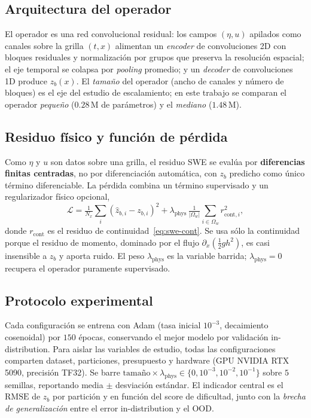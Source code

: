 \documentclass[conference]{IEEEtran}
\newcommand{\zb}{z_b}
\newcommand{\RMSE}{\mathrm{RMSE}}
\begin{document}
\subsection{Arquitectura del operador}
El operador es una red convolucional residual: los campos $(\eta,u)$ apilados
como canales sobre la grilla $(t,x)$ alimentan un \emph{encoder} de
convoluciones 2D con bloques residuales y normalización por grupos que preserva
la resolución espacial; el eje temporal se colapsa por \emph{pooling} promedio; y
un \emph{decoder} de convoluciones 1D produce $\zb(x)$. El \emph{tamaño} del
operador (ancho de canales y número de bloques) es el eje del estudio de
escalamiento; en este trabajo se comparan el operador \emph{pequeño}
($0.28$\,M de parámetros) y el \emph{mediano} ($1.48$\,M).

\subsection{Residuo físico y función de pérdida}
Como $\eta$ y $u$ son datos sobre una grilla, el residuo SWE se evalúa por
\textbf{diferencias finitas centradas}, no por diferenciación automática,
con $\zb$ predicho como único término diferenciable. La pérdida combina un
término supervisado y un regularizador físico opcional,
\begin{equation}
  \mathcal{L} = \tfrac{1}{N_x}\textstyle\sum_i (\hat z_{b,i}-z_{b,i})^2
    + \lambda_{\text{phys}}\,\tfrac{1}{|\Omega_w|}\textstyle\sum_{i\in\Omega_w}
      r_{\text{cont},i}^2,
  \label{eq:loss}
\end{equation}
donde $r_{\text{cont}}$ es el residuo de continuidad~\eqref{eq:swe-cont}. Se usa
sólo la continuidad porque el residuo de momento, dominado por el flujo
$\partial_x(\tfrac12 g h^2)$, es casi insensible a $\zb$ y aporta ruido. El peso
$\lambda_{\text{phys}}$ es la variable barrida; $\lambda_{\text{phys}}=0$
recupera el operador puramente supervisado.

\subsection{Protocolo experimental}
Cada configuración se entrena con Adam (tasa inicial $10^{-3}$, decaimiento
cosenoidal) por $150$ épocas, conservando el mejor modelo por validación
in-distribution. Para aislar las variables de estudio, todas las
configuraciones comparten dataset, particiones, presupuesto y hardware (GPU
NVIDIA RTX 5090, precisión TF32). Se barre
$\text{tamaño}\times\lambda_{\text{phys}}\in\{0,10^{-3},10^{-2},10^{-1}\}$ sobre
$5$ semillas, reportando media $\pm$ desviación estándar. El indicador central
es el $\RMSE$ de $\zb$ por partición y en función del score de dificultad, junto
con la \emph{brecha de generalización} entre el error in-distribution y el OOD.
\end{document}
